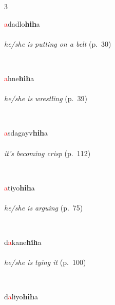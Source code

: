 \documentclass[oneside,openany]{book}%
\begin{document}
\noindent\begin{multicols}{3}%
\begin{minipage}[t]{\linewidth}
\raggedright\noindent \textcolor{Red}{a}dadlo\textbf{hih}a\\
\\
\noindent \textit{he/she is putting on a belt} (p.~30)
\end{minipage}\\[1em]%
\begin{minipage}[t]{\linewidth}
\raggedright\noindent \textcolor{Red}{a}hne\textbf{hih}a\\
\\
\noindent \textit{he/she is wrestling} (p.~39)
\end{minipage}\\[1em]%
\begin{minipage}[t]{\linewidth}
\raggedright\noindent \textcolor{Red}{a}sdagayv\textbf{hih}a\\
\\
\noindent \textit{it's becoming crisp} (p.~112)
\end{minipage}\\[1em]%
\begin{minipage}[t]{\linewidth}
\raggedright\noindent \textcolor{Red}{a}tiyo\textbf{hih}a\\
\\
\noindent \textit{he/she is arguing} (p.~75)
\end{minipage}\\[1em]%
\begin{minipage}[t]{\linewidth}
\raggedright\noindent d\textcolor{Red}{a}kane\textbf{hih}a\\
\\
\noindent \textit{he/she is tying it} (p.~100)
\end{minipage}\\[1em]%
\begin{minipage}[t]{\linewidth}
\raggedright\noindent d\textcolor{Red}{a}liyo\textbf{hih}a\\
\\

\end{minipage}
\end{multicols}
\end{document}
